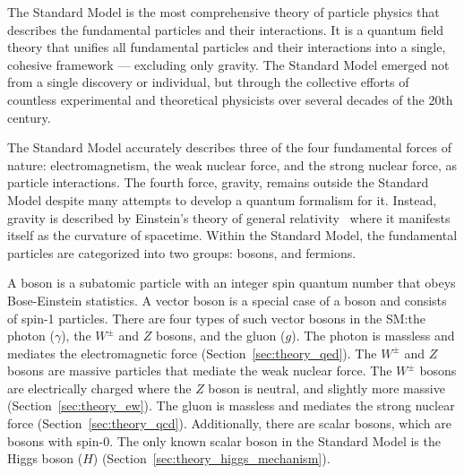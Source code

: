 The Standard Model is the most comprehensive theory of particle physics that describes the fundamental particles and their interactions. It is a quantum field theory that unifies all fundamental particles and their interactions into a single, cohesive framework --- excluding only gravity. The Standard Model emerged not from a single discovery or individual, but through the collective efforts of countless experimental and theoretical physicists over several decades of the 20th century.

The Standard Model accurately describes three of the four fundamental forces of nature: electromagnetism, the weak nuclear force, and the strong nuclear force, as particle interactions. The fourth force, gravity, remains outside the Standard Model despite many attempts to develop a quantum formalism for it. Instead, gravity is described by Einstein's theory of general relativity~\cite{GR_review_article} where it manifests itself as the curvature of spacetime. Within the Standard Model, the fundamental particles are categorized into two groups: bosons, and fermions.

A boson is a subatomic particle with an integer spin quantum number that obeys Bose-Einstein statistics. A vector boson is a special case of a boson and consists of spin-1 particles. There are four types of such vector bosons in the SM:\@ the photon ($\gamma$), the $W^{\pm}$ and $Z$ bosons, and the gluon ($g$). The photon is massless and mediates the electromagnetic force (Section~\ref{sec:theory_qed}). The $W^{\pm}$ and $Z$ bosons are massive particles that mediate the weak nuclear force. The $W^\pm$ bosons are electrically charged where the $Z$ boson is neutral, and slightly more massive (Section~\ref{sec:theory_ew}). The gluon is massless and mediates the strong nuclear force (Section~\ref{sec:theory_qcd}). Additionally, there are scalar bosons, which are bosons with spin-0. The only known scalar boson in the Standard Model is the Higgs boson ($H$) (Section~\ref{sec:theory_higgs_mechanism}).

